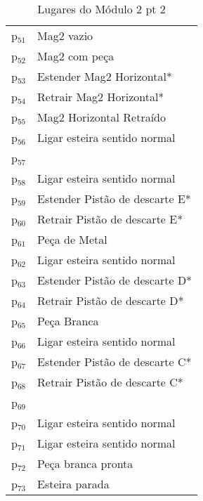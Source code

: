 \begin{table}[htbp]
\caption{Lugares do Módulo 2 pt 2}
\centering
\begin{tabular}{ll}
p\(_{\text{51}}\) & Mag2 vazio\\
p\(_{\text{52}}\) & Mag2 com peça\\
p\(_{\text{53}}\) & Estender Mag2 Horizontal*\\
p\(_{\text{54}}\) & Retrair Mag2 Horizontal*\\
p\(_{\text{55}}\) & Mag2 Horizontal Retraído\\
p\(_{\text{56}}\) & Ligar esteira sentido normal\\
p\(_{\text{57}}\) & \\
p\(_{\text{58}}\) & Ligar esteira sentido normal\\
p\(_{\text{59}}\) & Estender Pistão de descarte E*\\
p\(_{\text{60}}\) & Retrair Pistão de descarte E*\\
p\(_{\text{61}}\) & Peça de Metal\\
p\(_{\text{62}}\) & Ligar esteira sentido normal\\
p\(_{\text{63}}\) & Estender Pistão de descarte D*\\
p\(_{\text{64}}\) & Retrair Pistão de descarte D*\\
p\(_{\text{65}}\) & Peça Branca\\
p\(_{\text{66}}\) & Ligar esteira sentido normal\\
p\(_{\text{67}}\) & Estender Pistão de descarte C*\\
p\(_{\text{68}}\) & Retrair Pistão de descarte C*\\
p\(_{\text{69}}\) & \\
p\(_{\text{70}}\) & Ligar esteira sentido normal\\
p\(_{\text{71}}\) & Ligar esteira sentido normal\\
p\(_{\text{72}}\) & Peça branca pronta\\
p\(_{\text{73}}\) & Esteira parada\\
\end{tabular}
\end{table}


